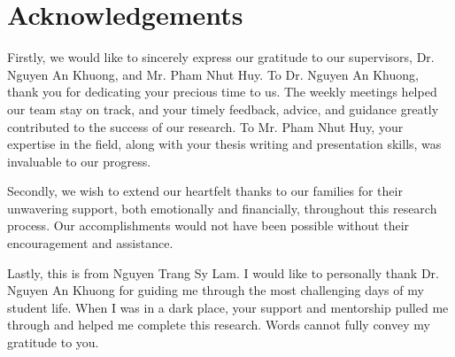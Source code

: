 \chapter*{Acknowledgements}

Firstly, we would like to sincerely express our gratitude to our supervisors, Dr. Nguyen An Khuong, and Mr. Pham Nhut Huy. To Dr. Nguyen An Khuong, thank you for dedicating your precious time to us. The weekly meetings helped our team stay on track, and your timely feedback, advice, and guidance greatly contributed to the success of our research. To Mr. Pham Nhut Huy, your expertise in the field, along with your thesis writing and presentation skills, was invaluable to our progress.

Secondly, we wish to extend our heartfelt thanks to our families for their unwavering support, both emotionally and financially, throughout this research process. Our accomplishments would not have been possible without their encouragement and assistance.

Lastly, this is from Nguyen Trang Sy Lam. I would like to personally thank Dr. Nguyen An Khuong for guiding me through the most challenging days of my student life. When I was in a dark place, your support and mentorship pulled me through and helped me complete this research. Words cannot fully convey my gratitude to you.